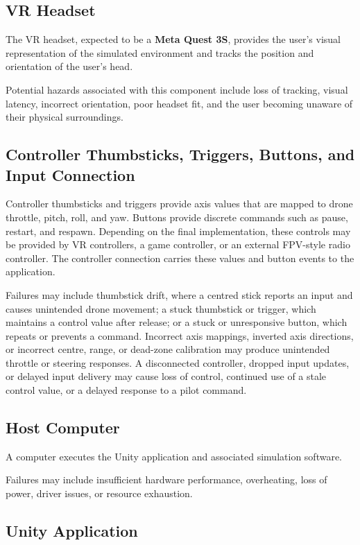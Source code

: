\documentclass{article}
\begin{document}
\subsection{VR Headset}

The VR headset, expected to be a \textbf{Meta Quest 3S}, provides the user's
visual representation of the simulated environment and tracks the position and
orientation of the user's head.

Potential hazards associated with this component include loss of tracking,
visual latency, incorrect orientation, poor headset fit, and the user becoming
unaware of their physical surroundings.

\subsection{Controller Thumbsticks, Triggers, Buttons, and Input Connection}

Controller thumbsticks and triggers provide axis values that are mapped to
drone throttle, pitch, roll, and yaw. Buttons provide discrete commands such as
pause, restart, and respawn. Depending on the final implementation, these
controls may be provided by VR controllers, a game controller, or an external
FPV-style radio controller. The controller connection carries these values and
button events to the application.

Failures may include thumbstick drift, where a centred stick reports an input
and causes unintended drone movement; a stuck thumbstick or trigger,
which maintains a control value after release; or a stuck or unresponsive
button, which repeats or prevents a command. Incorrect axis mappings, inverted
axis directions, or incorrect centre, range, or dead-zone calibration may
produce unintended throttle or steering responses. A disconnected controller,
dropped input updates, or delayed input delivery may cause loss of control,
continued use of a stale control value, or a delayed response to a pilot command.

\subsection{Host Computer}

A computer executes the Unity application and associated simulation software.

Failures may include insufficient hardware performance, overheating, loss of
power, driver issues, or resource exhaustion.

\subsection{Unity Application}
\end{document}
